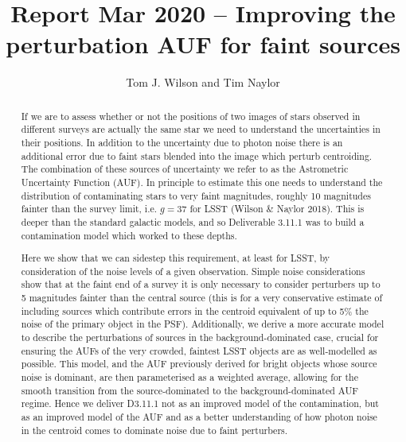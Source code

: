 \documentclass[fleqn,usenatbib]{mnras}
\title[]{Report Mar 2020 – Improving the perturbation AUF for faint sources}
\author[Tom J. Wilson and Tim Naylor]{
Tom J. Wilson
and Tim Naylor
\\
}
\date{}
\begin{document}
\label{firstpage}
\pagerange{\pageref{firstpage}--\pageref{lastpage}}
\maketitle
\begin{abstract}

If we are to assess whether or not the positions of two images of stars observed in different surveys are actually the same star we need to understand the uncertainties in their positions.  In addition to the uncertainty due to photon noise there is an additional error due to faint stars blended into the image which perturb centroiding.  The combination of these sources of uncertainty we refer to as the Astrometric Uncertainty Function (AUF).  In principle to estimate this one needs to understand the distribution of contaminating stars to very faint magnitudes, roughly 10 magnitudes fainter than the survey limit, i.e. $g=37$ for LSST (Wilson \& Naylor 2018).  This is deeper than the standard galactic models, and so Deliverable 3.11.1 was to build a contamination model which worked to these depths.

Here we show that we can sidestep this requirement, at least for LSST, by consideration of the noise levels of a given observation.  Simple noise considerations show that at the faint end of a survey it is only necessary to consider perturbers up to 5 magnitudes fainter than the central source (this is for a very conservative estimate of including sources which contribute errors in the centroid equivalent of up to 5\% the noise of the primary object in the PSF).  Additionally, we derive a more accurate model to describe the perturbations of sources in the background-dominated case, crucial for ensuring the AUFs of the very crowded, faintest LSST objects are as well-modelled as possible. This model, and the AUF previously derived for bright objects whose source noise is dominant, are then parameterised as a weighted average, allowing for the smooth transition from the source-dominated to the background-dominated AUF regime.  Hence we deliver D3.11.1 not as an improved model of the contamination, but as an improved model of the AUF and as a better understanding of how photon noise in the centroid comes to dominate noise due to faint perturbers.

\end{abstract}

\end{document}
